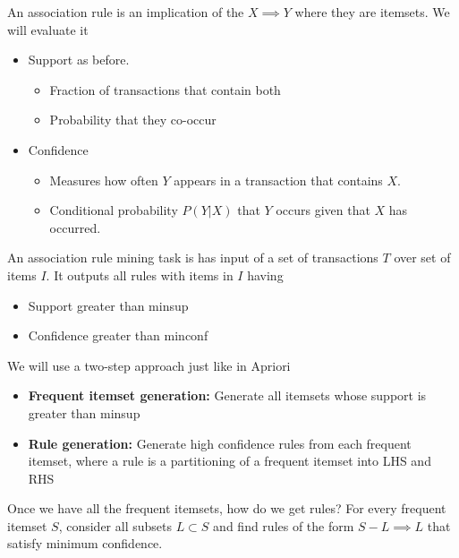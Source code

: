        An association rule is an implication of the $X \implies Y$ where they are itemsets. We will evaluate it
        \begin{itemize}
            \item Support as before. \begin{itemize}
                \item Fraction of transactions that contain both 
                \item Probability that they co-occur
            \end{itemize}
            \item Confidence \begin{itemize}
                \item Measures how often $Y$ appears in a transaction that contains $X$.
                \item Conditional probability $P(Y | X)$ that $Y$ occurs given that $X$ has occurred. 
            \end{itemize}
        \end{itemize}
        
        An association rule mining task is has input of a set of transactions $T$ over set of items $I$. It outputs all rules with items in $I$ having 
        \begin{itemize}
            \item Support greater than minsup
            \item Confidence greater than minconf
        \end{itemize}

        We will use a two-step approach just like in Apriori
        \begin{itemize}
            \item \textbf{Frequent itemset generation:} Generate all itemsets whose support is greater than minsup
            \item \textbf{Rule generation:} Generate high confidence rules from each frequent itemset, where a rule is a partitioning of a frequent itemset into LHS and RHS
        \end{itemize}
        
        Once we have all the frequent itemsets, how do we get rules? For every frequent itemset $S$, consider all subsets $L \subset S$ and find rules of the form $S - L \implies L$ that satisfy minimum confidence. 
        
